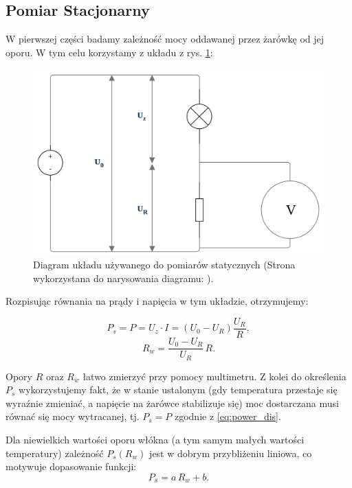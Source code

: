 \documentclass[12pt]{article}
\begin{document}
\subsection{Pomiar Stacjonarny}
W pierwszej części badamy zależność mocy oddawanej przez żarówkę od jej oporu. W tym celu korzystamy z układu z rys. \ref{fig:pomiar_stac}:
\begin{figure}[H]
    \centering
    \includegraphics[scale=0.25]{static}
    \caption{Diagram układu używanego do pomiarów statycznych (Strona wykorzystana do narysowania diagramu: \cite{diagram}).}
    \label{fig:pomiar_stac}
\end{figure}

Rozpisując równania na prądy i napięcia w tym układzie, otrzymujemy:

\begin{equation}
    P_s = P = U_z \cdot I = (U_0 - U_R) \frac{U_R}{R},
    \label{eq:power_dis}
\end{equation}
\begin{equation}
    R_w = \frac{U_0 - U_R}{U_R}\,R.
    \label{eq:bulb_resistance}
\end{equation}

Opory $R$ oraz $R_w$ łatwo zmierzyć przy pomocy multimetru. Z kolei do określenia $P_s$ wykorzystujemy fakt, że w stanie ustalonym (gdy temperatura przestaje się wyraźnie zmieniać,
a napięcie na żarówce stabilizuje się) moc dostarczana musi równać się mocy wytracanej, tj. $P_s = P$ zgodnie z \eqref{eq:power_dis}.

Dla niewielkich wartości oporu włókna (a tym samym małych wartości temperatury) zależność $P_s(R_w)$ jest w dobrym przybliżeniu liniowa, co motywuje dopasowanie funkcji:
\begin{equation}
    P_s = a\,R_w + b.
    \label{eq:power_line}
\end{equation}
\end{document}
